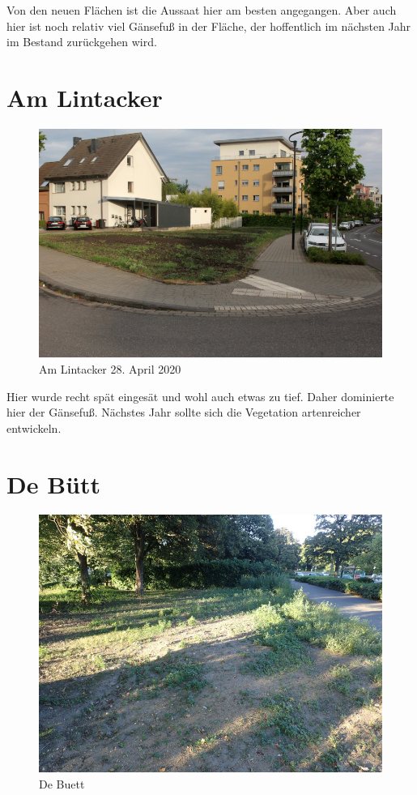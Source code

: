 \documentclass[10pt]{article}
\begin{document}
Von den neuen Flächen ist die Aussaat hier am besten angegangen. Aber auch hier ist noch relativ viel Gänsefuß in der Fläche, der hoffentlich im nächsten Jahr im Bestand zurückgehen wird.

\clearpage
\section{Am Lintacker}
\begin{figure}[h!]
  \includegraphics[width=\linewidth]{img/lintacker/april.jpg}
  \caption{Am Lintacker 28. April 2020}
\end{figure}

Hier wurde recht spät eingesät und wohl auch etwas zu tief. Daher dominierte hier der Gänsefuß.
Nächstes Jahr sollte sich die Vegetation artenreicher entwickeln.

\clearpage
\section{De Bütt}
\begin{figure}[h!]
  \includegraphics[width=\linewidth]{img/buett/juli.jpg}
  \caption{De Buett}
\end{figure}
\end{document}
